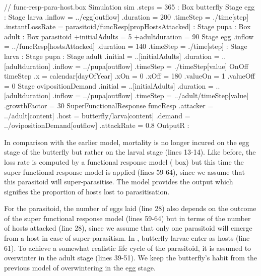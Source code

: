\lstset{numbers=left}
\begin{boxscript}
// func-resp-para-host.box
Simulation sim {
  .steps = 365
  :
  Box butterfly {
    Stage egg {
    :
    }
    Stage larva {
      .inflow = ../egg[outflow]
      .duration = 200
      .timeStep = ./time[step]
      .instantLossRate = 
         parasitoid/funcResp[propHostsAttacked]
      :
    }
    Stage pupa {
    :
    }
    Box adult {
    :
    }
  }
  Box parasitoid {
    +initialAdults = 5
    +adultduration = 90
    Stage egg {
      .inflow = ../funcResp[hostsAttacked]
      .duration = 140
      .timeStep = ./time[step]
      :
    }
    Stage larva {
    :
    }
    Stage pupa {
    :
    }
    Stage adult {
      .initial  = ..[initialAdults]
      .duration = ..[adultduration]
      .inflow   = ../pupa[outflow]
      .timeStep = ./timeStep[value]
      OnOff timeStep { 
        .x = calendar[dayOfYear]
        .xOn = 0 
        .xOff = 180
        .valueOn = 1
        .valueOff = 0
      }
    }
    Stage ovipositionDemand {
      .initial  = ..[initialAdults]
      .duration = ..[adultduration]
      .inflow   = ../pupa[outflow]
      .timeStep = ../adult/timeStep[value]
      .growthFactor = 30
    }
    SuperFunctionalResponse funcResp {
      .attacker = ../adult[content]
      .host = butterfly/larva[content]
      .demand = ../ovipositionDemand[outflow]
      .attackRate = 0.8
    }
  }
  OutputR {
  :
  }
}
\end{boxscript}
\lstset{numbers=none}

In comparison with the earlier model, mortality is no longer incured on the egg stage of the butterfly but rather on the larval stage (lines 13-14). Like before, the loss rate is computed by a functional response model ( box) but this time the
super functional response model is applied (lines 59-64), since we assume that this parasitoid will super-parasitise. The  model provides the  output which signifies the proportion of hosts lost to parasitisation.

For the parasitoid, the number of eggs laid (line 28) also depends on the outcome of the super functional response model (lines 59-64) but in terms of the number of hosts attacked (line 28), since we assume that only one parasitoid will emerge from a host in case of super-parasitism. In , butterfly larvae enter as hosts (line 61). To achieve a somewhat realistic life cycle of the parasitoid, it is assumed to overwinter in the adult stage (lines 39-51). We keep the butterfly's habit from the previous model of overwintering in the egg stage. 

